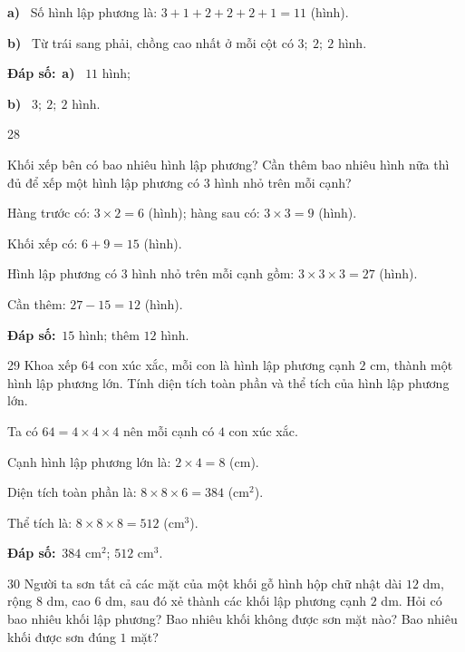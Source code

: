 \documentclass[11pt]{article}
\newif\ifsol \solfalse
\providecommand{\AnsWord}{Đáp số}
\newcommand{\dapso}[1]{\par\textbf{\AnsWord:}\ #1}
\newcommand{\probsol}[1]{%
  \begin{lrbox}{\solmeasure}\begin{minipage}{\dimexpr\linewidth-24pt\relax}#1\end{minipage}\end{lrbox}%
  \ifsol
    \begin{solbox}#1\end{solbox}%
  \else
    \setlength{\solht}{\dimexpr\ht\solmeasure+\dp\solmeasure+0.85cm\relax}%
    \ifdim\solht<1.35cm\setlength{\solht}{1.35cm}\fi
    \begin{tcolorbox}[colback=white,colframe=Line,boxrule=0.8pt,arc=5pt,
      left=8pt,right=8pt,top=4pt,bottom=4pt,height=\solht]{\footnotesize\color{Slate}\itshape\WorkWord}\end{tcolorbox}%
  \fi}
\newcommand{\pa}[1]{\textbf{#1)}\ }
\newcommand{\gap}{\vspace{0.3cm}}
\def\WorkWord{Bài làm:}
\def\AnsWord{Đáp số}
\begin{document}
\probsol{
\pa{a} Số hình lập phương là: $3+1+2+2+2+1=11$ (hình).\par
\pa{b} Từ trái sang phải, chồng cao nhất ở mỗi cột có $3;\ 2;\ 2$ hình.
\dapso{\pa{a} $11$ hình;\par \pa{b} $3;\ 2;\ 2$ hình.}}
\gap
\begin{probbox}{28}{\relax}
\begin{minipage}[t]{0.6\linewidth}
Khối xếp bên có bao nhiêu hình lập phương? Cần thêm bao nhiêu hình nữa thì đủ để xếp một hình lập phương có $3$ hình nhỏ trên mỗi cạnh?
\end{minipage}\hfill
\begin{minipage}[t]{0.36\linewidth}\vspace{0pt}\centering
{}
\end{minipage}
\end{probbox}
\probsol{
Hàng trước có: $3\times2=6$ (hình); hàng sau có: $3\times3=9$ (hình).\par
Khối xếp có: $6+9=15$ (hình).\par
Hình lập phương có $3$ hình nhỏ trên mỗi cạnh gồm: $3\times3\times3=27$ (hình).\par
Cần thêm: $27-15=12$ (hình).
\dapso{$15$ hình; thêm $12$ hình.}}
\gap
\begin{probbox}{29}{\relax}
Khoa xếp $64$ con xúc xắc, mỗi con là hình lập phương cạnh $2$ cm, thành một hình lập phương lớn. Tính diện tích toàn phần và thể tích của hình lập phương lớn.
\end{probbox}
\probsol{
Ta có $64=4\times4\times4$ nên mỗi cạnh có $4$ con xúc xắc.\par
Cạnh hình lập phương lớn là: $2\times4=8$ (cm).\par
Diện tích toàn phần là: $8\times8\times6=384$ (cm$^2$).\par
Thể tích là: $8\times8\times8=512$ (cm$^3$).
\dapso{$384$ cm$^2$; $512$ cm$^3$.}}
\gap
\begin{probbox}{30}{\relax}
Người ta sơn tất cả các mặt của một khối gỗ hình hộp chữ nhật dài $12$ dm, rộng $8$ dm, cao $6$ dm, sau đó xẻ thành các khối lập phương cạnh $2$ dm. Hỏi có bao nhiêu khối lập phương? Bao nhiêu khối không được sơn mặt nào? Bao nhiêu khối được sơn đúng $1$ mặt?
\end{probbox}
\end{document}
